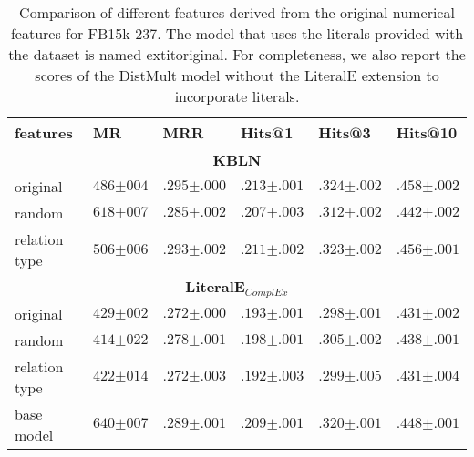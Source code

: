
\begin{table}[]
\setlength{\tabcolsep}{6pt}
\renewcommand{\arraystretch}{1.1}

\caption{Comparison of different features derived from the original numerical features for FB15k-237. The model that uses the literals provided with the dataset is named 	extit{original}. For completeness, we also report the scores of the DistMult model without the LiteralE extension to incorporate literals.}
\label{tab:variations}
\begin{center}

\begin{tabular}{l|lllll}
\hline
\multicolumn{1}{l|}{\textbf{features}} & \textbf{MR} & \textbf{MRR} & \textbf{Hits@1} & \textbf{Hits@3} & \textbf{Hits@10} \\
\hline \multicolumn{6}{c}{\textbf{KBLN}} \\ \hline 
original & $486{\scriptstyle \pm 004}$ & $.295{\scriptstyle \pm .000}$ & $.213{\scriptstyle \pm .001}$ & $.324{\scriptstyle \pm .002}$ & $.458{\scriptstyle \pm .002}$ \\ 
random & $618{\scriptstyle \pm 007}$ & $.285{\scriptstyle \pm .002}$ & $.207{\scriptstyle \pm .003}$ & $.312{\scriptstyle \pm .002}$ & $.442{\scriptstyle \pm .002}$ \\ 
relation type & $506{\scriptstyle \pm 006}$ & $.293{\scriptstyle \pm .002}$ & $.211{\scriptstyle \pm .002}$ & $.323{\scriptstyle \pm .002}$ & $.456{\scriptstyle \pm .001}$ \\ 
\hline \multicolumn{6}{c}{\textbf{LiteralE$_{ComplEx}$}} \\ \hline 
original & $429{\scriptstyle \pm 002}$ & $.272{\scriptstyle \pm .000}$ & $.193{\scriptstyle \pm .001}$ & $.298{\scriptstyle \pm .001}$ & $.431{\scriptstyle \pm .002}$ \\ 
random & $414{\scriptstyle \pm 022}$ & $.278{\scriptstyle \pm .001}$ & $.198{\scriptstyle \pm .001}$ & $.305{\scriptstyle \pm .002}$ & $.438{\scriptstyle \pm .001}$ \\ 
relation type & $422{\scriptstyle \pm 014}$ & $.272{\scriptstyle \pm .003}$ & $.192{\scriptstyle \pm .003}$ & $.299{\scriptstyle \pm .005}$ & $.431{\scriptstyle \pm .004}$ \\ 
base model & $640{\scriptstyle \pm 007}$ & $.289{\scriptstyle \pm .001}$ & $.209{\scriptstyle \pm .001}$ & $.320{\scriptstyle \pm .001}$ & $.448{\scriptstyle \pm .001}$ \\ 

\hline
\end{tabular}
\end{center}
\end{table}
